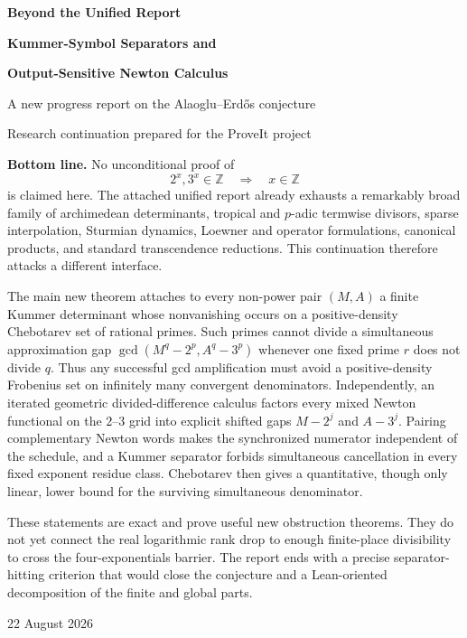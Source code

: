 \documentclass[11pt,oneside]{article}
\theoremstyle{definition}
\theoremstyle{remark}
\newcommand{\Z}{\mathbb Z}
\begin{document}
\hypersetup{pageanchor=false}

\begin{titlepage}
\centering
\vspace*{0.7cm}
{\Huge\bfseries Beyond the Unified Report\par}
\vspace{0.35cm}
{\LARGE\bfseries Kummer-Symbol Separators and\par}
\vspace{0.12cm}
{\LARGE\bfseries Output-Sensitive Newton Calculus\par}
\vspace{0.6cm}
{\Large A new progress report on the Alaoglu--Erd\H{o}s conjecture\par}
\vspace{0.8cm}
{\large Research continuation prepared for the ProveIt project\par}
\vfill
\begin{minipage}{0.9\textwidth}
\small
\textbf{Bottom line.}
No unconditional proof of
\[
  2^x,3^x\in\Z\quad\Longrightarrow\quad x\in\Z
\]
is claimed here.  The attached unified report already exhausts a remarkably broad family of
archimedean determinants, tropical and $p$-adic termwise divisors, sparse interpolation,
Sturmian dynamics, Loewner and operator formulations, canonical products, and standard
transcendence reductions.  This continuation therefore attacks a different interface.

The main new theorem attaches to every non-power pair $(M,A)$ a finite Kummer determinant
whose nonvanishing occurs on a positive-density Chebotarev set of rational primes.  Such
primes cannot divide a simultaneous approximation gap
$\gcd(M^q-2^p,A^q-3^p)$ whenever one fixed prime $r$ does not divide $q$.  Thus any successful
gcd amplification must avoid a positive-density Frobenius set on infinitely many convergent
denominators.  Independently, an iterated geometric divided-difference calculus factors every
mixed Newton functional on the $2$--$3$ grid into explicit shifted gaps
$M-2^j$ and $A-3^j$.  Pairing complementary Newton words makes the synchronized numerator
independent of the schedule, and a Kummer separator forbids simultaneous cancellation in
every fixed exponent residue class.  Chebotarev then gives a quantitative, though only
linear, lower bound for the surviving simultaneous denominator.

These statements are exact and prove useful new obstruction theorems.  They do not yet
connect the real logarithmic rank drop to enough finite-place divisibility to cross the
four-exponentials barrier.  The report ends with a precise separator-hitting criterion that
would close the conjecture and a Lean-oriented decomposition of the finite and global parts.
\end{minipage}
\vfill
{\large 22 August 2026\par}
\end{titlepage}
\end{document}
